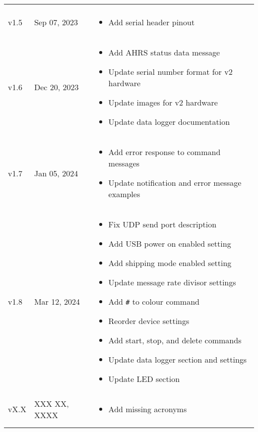 \begin{longtable}{| >{\centering}p{} | p{} | >{\raggedright\arraybackslash}p{} |}
\begin{itemize}
        \end{itemize}\\
        v1.5 & Sep 07, 2023 &
        \begin{itemize}
            \item Add serial header pinout
        \end{itemize}\\
        v1.6 & Dec 20, 2023 &
        \begin{itemize}
            \item Add \acs{AHRS} status data message
            \item Update serial number format for v2 hardware
            \item Update images for v2 hardware
            \item Update data logger documentation
        \end{itemize}\\
        v1.7 & Jan 05, 2024 &
        \begin{itemize}
            \item Add error response to command messages
            \item Update notification and error message examples
        \end{itemize}\\
        v1.8 & Mar 12, 2024 &
        \begin{itemize}
            \item Fix \acs{UDP} send port description
            \item Add \ac{USB} power on enabled setting
            \item Add shipping mode enabled setting
            \item Update message rate divisor settings
            \item Add \texttt{\#} to colour command
            \item Reorder device settings
            \item Add start, stop, and delete commands
            \item Update data logger section and settings
            \item Update \ac{LED} section
        \end{itemize}\\
        vX.X & XXX XX, XXXX &
        \begin{itemize}
            \item Add missing acronyms
        \end{itemize}\\
        \arrayrulecolor{gray!50}\hline
    \end{longtable}
\endgroup
